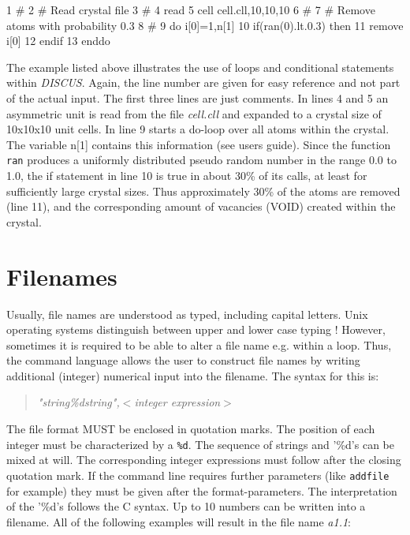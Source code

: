 \begin{MacVerbatim}
     1  #
     2  # Read crystal file
     3  #
     4  read
     5  cell cell.cll,10,10,10
     6  #
     7  # Remove atoms with probability 0.3
     8  #
     9  do i[0]=1,n[1]
    10     if(ran(0).lt.0.3) then
    11        remove i[0]
    12     endif
    13  enddo
\end{MacVerbatim}

The example listed above illustrates the use of loops and
conditional statements within {\it DISCUS}. Again, the line number
are given for easy reference and not part of the actual
input. The first three lines are just comments. In lines 4 and 5 an
asymmetric unit is read from the file {\it cell.cll} and expanded to
a crystal size of 10x10x10 unit cells. In line 9 starts a do-loop
over all atoms within the crystal. The variable n[1] contains this
information (see \Discus users guide). Since
the function {\tt ran} produces a uniformly distributed pseudo
random number in the range 0.0 to 1.0, the if statement in line 10
is true in about 30\% of its calls, at least for sufficiently large 
crystal sizes. Thus approximately 30\% of the atoms are removed
(line 11), and the corresponding amount of vacancies (VOID) created
within the crystal.


\section{Filenames \label{fnames}}

Usually, file names are understood as typed, including capital
letters. Unix operating systems distinguish between upper and lower
case typing ! However, sometimes it is required to be able to alter
a file name e.g. within a loop.  Thus, the command language allows the 
user to construct file names by writing additional (integer) numerical
input into the filename.  The syntax for this is:

\begin{quote}
  {\it "string\%dstring",$<$integer expression$>$}
\end{quote}

The file format MUST be enclosed in quotation marks.  The position
of each integer must be characterized by a {\tt \%d}.  The sequence
of strings and '\%d's can be mixed at will.  The corresponding
integer expressions must follow after the closing quotation mark. If
the command line requires further parameters (like {\tt addfile} for
example) they must be given after the format-parameters.  The
interpretation of the '\%d's follows the C syntax. Up to 10 numbers
can be written into a filename.  All of the following examples will
result in the file name {\it a1.1}:

